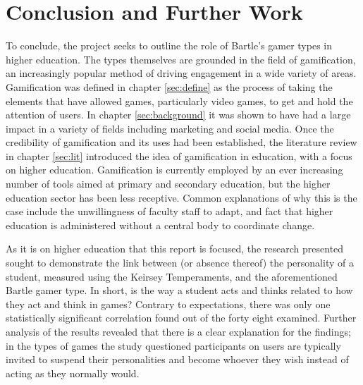 \documentclass[12pt,a4paper,twoside]{report}
\begin{document}
\chapter{Conclusion and Further Work}
\label{sec:conclusion}
To conclude, the project seeks to outline the role of Bartle's gamer types in higher education. The types themselves are grounded in the field of gamification, an increasingly popular method of driving engagement in a wide variety of areas. Gamification was defined in chapter \ref{sec:define} as the process of taking the elements that have allowed games, particularly video games, to get and hold the attention of users. In chapter \ref{sec:background} it was shown to have had a large impact in a variety of fields including marketing and social media. Once the credibility of gamification and its uses had been established, the literature review in chapter \ref{sec:lit} introduced the idea of gamification in education, with a focus on higher education. Gamification is currently employed by an ever increasing number of tools aimed at primary and secondary education, but the higher education sector has been less receptive. Common explanations of why this is the case include the unwillingness of faculty staff to adapt, and fact that higher education is administered without a central body to coordinate change.

As it is on higher education that this report is focused, the research presented sought to demonstrate the link between (or absence thereof) the personality of a student, measured using the Keirsey Temperaments, and the aforementioned Bartle gamer type. In short, is the way a student acts and thinks related to how they act and think in games? Contrary to expectations, there was only one statistically significant correlation found out of the forty eight examined. Further analysis of the results revealed that there is a clear explanation for the findings; in the types of games the study questioned participants on users are typically invited to suspend their personalities and become whoever they wish instead of acting as they normally would.
\end{document}
